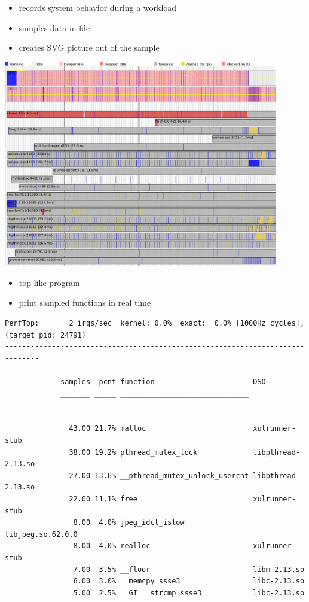 \begin{frame}{}
\begin{itemize}
  \item records system behavior during a workload
  \item samples data in file
  \item creates SVG picture out of the sample
\end{itemize}
\pause
\includegraphics[width=12cm]{res/timechart}
\end{frame}

\begin{frame}[fragile]{}
\begin{itemize}
  \item top like program
  \item print sampled functions in real time
\end{itemize}
\pause
\begin{lstlisting}[basicstyle=\tiny\ttfamily]
   PerfTop:       2 irqs/sec  kernel: 0.0%  exact:  0.0% [1000Hz cycles],  (target_pid: 24791)
------------------------------------------------------------------------------

             samples  pcnt function                       DSO
             _______ _____ ______________________________ __________________

               43.00 21.7% malloc                         xulrunner-stub    
               38.00 19.2% pthread_mutex_lock             libpthread-2.13.so
               27.00 13.6% __pthread_mutex_unlock_usercnt libpthread-2.13.so
               22.00 11.1% free                           xulrunner-stub    
                8.00  4.0% jpeg_idct_islow                libjpeg.so.62.0.0 
                8.00  4.0% realloc                        xulrunner-stub    
                7.00  3.5% __floor                        libm-2.13.so      
                6.00  3.0% __memcpy_ssse3                 libc-2.13.so      
                5.00  2.5% __GI___strcmp_ssse3            libc-2.13.so      
\end{lstlisting}
\end{frame}

